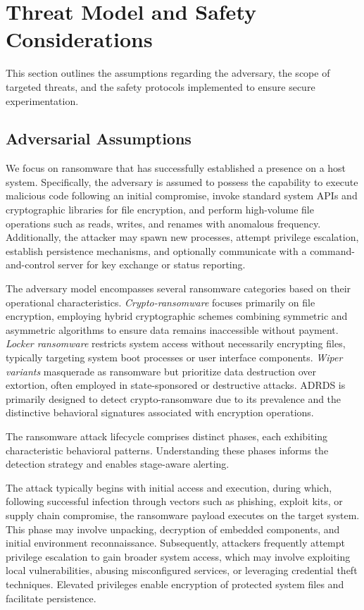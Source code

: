 \section{Threat Model and Safety Considerations}

This section outlines the assumptions regarding the adversary, the scope of targeted threats, and the safety protocols implemented to ensure secure experimentation.

\subsection{Adversarial Assumptions}

We focus on ransomware that has successfully established a presence on a host system. Specifically, the adversary is assumed to possess the capability to execute malicious code following an initial compromise, invoke standard system APIs and cryptographic libraries for file encryption, and perform high-volume file operations such as reads, writes, and renames with anomalous frequency. Additionally, the attacker may spawn new processes, attempt privilege escalation, establish persistence mechanisms, and optionally communicate with a command-and-control server for key exchange or status reporting.

The adversary model encompasses several ransomware categories based on their operational characteristics. \emph{Crypto-ransomware} focuses primarily on file encryption, employing hybrid cryptographic schemes combining symmetric and asymmetric algorithms to ensure data remains inaccessible without payment. \emph{Locker ransomware} restricts system access without necessarily encrypting files, typically targeting system boot processes or user interface components. \emph{Wiper variants} masquerade as ransomware but prioritize data destruction over extortion, often employed in state-sponsored or destructive attacks. ADRDS is primarily designed to detect crypto-ransomware due to its prevalence and the distinctive behavioral signatures associated with encryption operations.

The ransomware attack lifecycle comprises distinct phases, each exhibiting characteristic behavioral patterns. Understanding these phases informs the detection strategy and enables stage-aware alerting.

The attack typically begins with initial access and execution, during which, following successful infection through vectors such as phishing, exploit kits, or supply chain compromise, the ransomware payload executes on the target system. This phase may involve unpacking, decryption of embedded components, and initial environment reconnaissance. Subsequently, attackers frequently attempt privilege escalation to gain broader system access, which may involve exploiting local vulnerabilities, abusing misconfigured services, or leveraging credential theft techniques. Elevated privileges enable encryption of protected system files and facilitate persistence.

